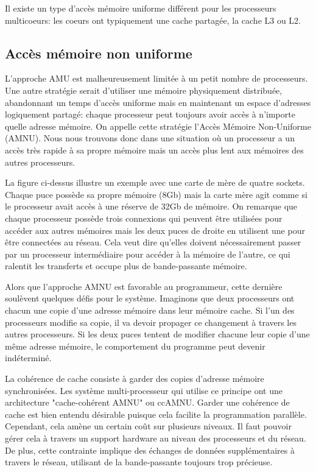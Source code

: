 	Il existe un type d'accès mémoire uniforme différent pour les processeurs multicoeurs: les coeurs ont typiquement une cache partagée, la cache L3 ou L2.
	
	\subsection{Accès mémoire non uniforme}
	L'approche AMU est malheureusement limitée à un petit nombre de processeurs. Une autre stratégie serait d'utiliser une mémoire physiquement distribuée, abandonnant un temps d'accès uniforme mais en maintenant un espace d'adresses logiquement partagé: chaque processeur peut toujours avoir accès à n'importe quelle adresse mémoire. On appelle cette stratégie l'Accès Mémoire Non-Uniforme (AMNU). Nous nous trouvons donc dans une situation où un processeur a un accès très rapide à sa propre mémoire mais un accès plus lent aux mémoires des autres processeurs.
	
	
	La figure ci-dessus illustre un exemple avec une carte de mère de quatre sockets. Chaque puce possède sa propre mémoire (8Gb) mais la carte mère agit comme si le processeur avait accès à une réserve de 32Gb de mémoire. On remarque que chaque processeur possède trois connexions qui peuvent être utilisées pour accéder aux autres mémoires mais les deux puces de droite en utilisent une pour être connectées au réseau. Cela veut dire qu'elles doivent nécessairement passer par un processeur intermédiaire pour accéder à la mémoire de l'autre, ce qui ralentit les transferts et occupe plus de bande-passante mémoire.
	
	Alors que l'approche AMNU est favorable au programmeur, cette dernière soulèvent quelques défis pour le système. Imaginons que deux processeurs ont chacun une copie d'une adresse mémoire dans leur mémoire cache. Si l'un des processeurs modifie sa copie, il va devoir propager ce changement à travers les autres processeurs. Si les deux puces tentent de modifier chacune leur copie d'une même adresse mémoire, le comportement du programme peut devenir indéterminé.
	
	La cohérence de cache consiste à garder des copies d'adresse mémoire synchronisées. Les système multi-processeur qui utilise ce principe ont une architecture "cache-cohérent AMNU" ou ccAMNU. Garder une cohérence de cache est bien entendu désirable puisque cela facilite la programmation parallèle. Cependant, cela amène un certain coût sur plusieurs niveaux. Il faut pouvoir gérer cela à travers un support hardware au niveau des processeurs et du réseau. De plus, cette contrainte implique des échanges de données supplémentaires à travers le réseau, utilisant de la bande-passante toujours trop précieuse.
	
